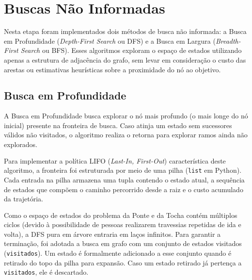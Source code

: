 \documentclass[12pt,a4paper]{article}
\begin{document}



\section{Buscas Não Informadas}
\label{sec:buscas-nao-informadas}

Nesta etapa foram implementados dois métodos de busca não informada: 
a Busca em Profundidade (\textit{Depth-First Search} ou DFS) e a Busca 
em Largura (\textit{Breadth-First Search} ou BFS). Esses algoritmos exploram o 
espaço de estados utilizando apenas a estrutura de adjacência do 
grafo, sem levar em consideração o custo das arestas ou estimativas 
heurísticas sobre a proximidade do nó ao objetivo.

\subsection{Busca em Profundidade}
\label{subsec:dfs}

A Busca em Profundidade busca explorar o nó mais profundo (o mais longe do nó inicial) 
presente na fronteira de busca. Caso atinja um estado sem sucessores válidos não visitados, o 
algoritmo realiza o retorna para explorar ramos ainda não explorados.

Para implementar a política LIFO (\textit{Last-In, First-Out}) característica deste 
algoritmo, a fronteira foi estruturada por meio de uma pilha (\texttt{list} em Python). 
Cada entrada na pilha armazena uma tupla contendo o estado atual, a sequência de estados 
que compõem o caminho percorrido desde a raiz e o custo acumulado da trajetória.

Como o espaço de estados do problema da Ponte e da Tocha contém múltiplos ciclos 
(devido à possibilidade de pessoas realizarem travessias repetidas de ida e volta), 
a DFS pura em árvore entraria em laços infinitos. Para garantir a terminação, foi 
adotada a busca em grafo com um conjunto de estados visitados (\texttt{visitados}). 
Um estado é formalmente adicionado a esse conjunto quando é retirado do topo da pilha 
para expansão. Caso um estado retirado já pertença a \texttt{visitados}, ele é descartado.
\end{document}
